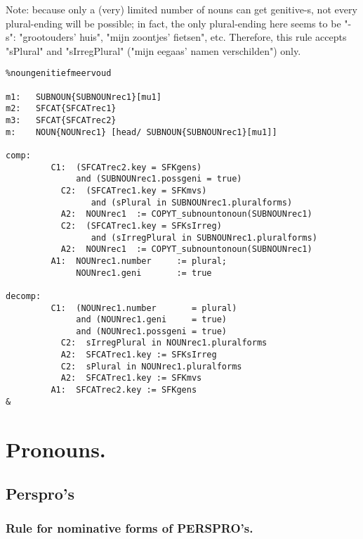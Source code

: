 Note: because only a (very) limited number of nouns can get genitive-s, not
      every plural-ending will be possible; in fact, the only plural-ending
      here seems to be "-s": "grootouders' huis", "mijn zoontjes' fietsen",
      etc. Therefore, this rule accepts "sPlural" and "sIrregPlural" ("mijn
      eegaas' namen verschilden") only.
\begin{verbatim}
%noungenitiefmeervoud

m1:   SUBNOUN{SUBNOUNrec1}[mu1]
m2:   SFCAT{SFCATrec1}
m3:   SFCAT{SFCATrec2}
m:    NOUN{NOUNrec1} [head/ SUBNOUN{SUBNOUNrec1}[mu1]]

comp:    
         C1:  (SFCATrec2.key = SFKgens) 
              and (SUBNOUNrec1.possgeni = true)
           C2:  (SFCATrec1.key = SFKmvs) 
                 and (sPlural in SUBNOUNrec1.pluralforms)
           A2:  NOUNrec1  := COPYT_subnountonoun(SUBNOUNrec1)
           C2:  (SFCATrec1.key = SFKsIrreg) 
                 and (sIrregPlural in SUBNOUNrec1.pluralforms)
           A2:  NOUNrec1  := COPYT_subnountonoun(SUBNOUNrec1)
         A1:  NOUNrec1.number     := plural;
              NOUNrec1.geni       := true

decomp:  
         C1:  (NOUNrec1.number       = plural) 
              and (NOUNrec1.geni     = true) 
              and (NOUNrec1.possgeni = true)
           C2:  sIrregPlural in NOUNrec1.pluralforms
           A2:  SFCATrec1.key := SFKsIrreg
           C2:  sPlural in NOUNrec1.pluralforms
           A2:  SFCATrec1.key := SFKmvs
         A1:  SFCATrec2.key := SFKgens
&
\end{verbatim}
\newpage
\section{Pronouns.}
\subsection{Perspro's}
\subsubsection{Rule for nominative forms of PERSPRO's.}

